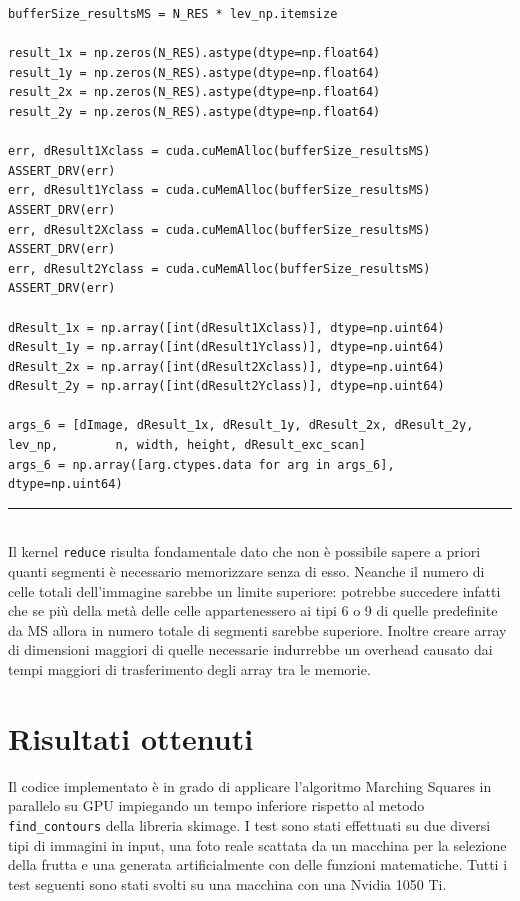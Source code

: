 \documentclass[12pt,a4paper]{report}
\begin{document}
{\begin{lstlisting}
bufferSize_resultsMS = N_RES * lev_np.itemsize

result_1x = np.zeros(N_RES).astype(dtype=np.float64)
result_1y = np.zeros(N_RES).astype(dtype=np.float64)
result_2x = np.zeros(N_RES).astype(dtype=np.float64)
result_2y = np.zeros(N_RES).astype(dtype=np.float64)

err, dResult1Xclass = cuda.cuMemAlloc(bufferSize_resultsMS)
ASSERT_DRV(err)
err, dResult1Yclass = cuda.cuMemAlloc(bufferSize_resultsMS)
ASSERT_DRV(err)
err, dResult2Xclass = cuda.cuMemAlloc(bufferSize_resultsMS)
ASSERT_DRV(err)
err, dResult2Yclass = cuda.cuMemAlloc(bufferSize_resultsMS)
ASSERT_DRV(err)

dResult_1x = np.array([int(dResult1Xclass)], dtype=np.uint64)
dResult_1y = np.array([int(dResult1Yclass)], dtype=np.uint64)
dResult_2x = np.array([int(dResult2Xclass)], dtype=np.uint64)
dResult_2y = np.array([int(dResult2Yclass)], dtype=np.uint64)

args_6 = [dImage, dResult_1x, dResult_1y, dResult_2x, dResult_2y, lev_np,        n, width, height, dResult_exc_scan]
args_6 = np.array([arg.ctypes.data for arg in args_6], dtype=np.uint64)
\end{lstlisting}
\noindent\rule[0.5ex]{\linewidth}{1pt} \\[2pt]
Il kernel \verb|reduce| risulta fondamentale dato che non è possibile sapere a priori quanti segmenti è necessario memorizzare senza di esso. Neanche il numero di celle totali dell'immagine sarebbe un limite superiore: potrebbe succedere infatti che se più della metà delle celle appartenessero ai tipi 6 o 9 di quelle predefinite da MS allora in numero totale di segmenti sarebbe superiore. Inoltre creare array di dimensioni maggiori di quelle necessarie indurrebbe un overhead causato dai tempi maggiori di trasferimento degli array tra le memorie.

\newpage

\chapter{Risultati ottenuti}
Il codice implementato è in grado di applicare l'algoritmo Marching Squares in parallelo su GPU impiegando un tempo inferiore rispetto al metodo \verb|find_contours| della libreria skimage. \newline
I test sono stati effettuati su due diversi tipi di immagini in input, una foto reale scattata da un macchina per la selezione della frutta e una generata artificialmente con delle funzioni matematiche.
Tutti i test seguenti sono stati svolti su una macchina con una Nvidia 1050 Ti.

}
\end{document}
